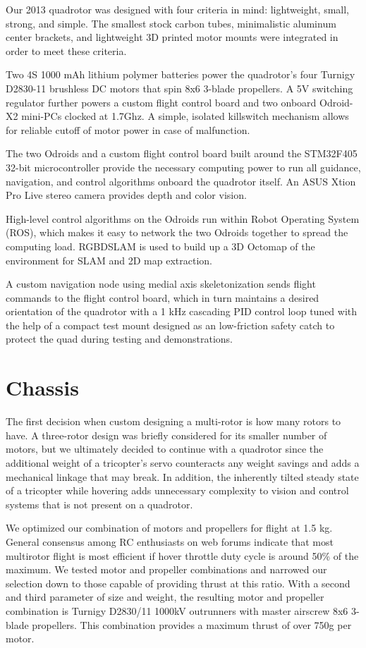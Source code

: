 \documentclass[12pt,letterpaper]{article} \usepackage[margin=1in]{geometry}
\begin{document}
Our 2013 quadrotor was designed with four criteria in mind: lightweight, small,
strong, and simple. The smallest stock carbon tubes, minimalistic aluminum
center brackets, and lightweight 3D printed motor mounts were integrated in
order to meet these criteria.

Two 4S 1000 mAh lithium polymer batteries power the quadrotor's four Turnigy
D2830-11 brushless DC motors that spin 8x6 3-blade propellers. A 5V switching
regulator further powers a custom flight control board and two onboard
Odroid-X2 mini-PCs clocked at 1.7Ghz. A simple, isolated killswitch mechanism
allows for reliable cutoff of motor power in case of malfunction.

The two Odroids and a custom flight control board built around the STM32F405
32-bit microcontroller provide the necessary computing power to run all
guidance, navigation, and control algorithms onboard the quadrotor itself. An
ASUS Xtion Pro Live stereo camera provides depth and color vision. 

High-level control algorithms on the Odroids run within Robot Operating System
(ROS), which makes it easy to network the two Odroids together to spread the
computing load. RGBDSLAM is used to build up a 3D Octomap of the environment
for SLAM and 2D map extraction.

A custom navigation node using medial axis skeletonization sends flight
commands to the flight control board, which in turn maintains a desired
orientation of the quadrotor with a 1 kHz cascading PID control loop tuned with
the help of a compact test mount designed as an low-friction safety catch to
protect the quad during testing and demonstrations.



\section*{Chassis}

The first decision when custom designing a multi-rotor is how many rotors to
have. A three-rotor design was briefly considered for its smaller number of
motors, but we ultimately decided to continue with a quadrotor since the
additional weight of a tricopter's servo counteracts any weight savings and
adds a mechanical linkage that may break. In addition, the inherently tilted
steady state of a tricopter while hovering adds unnecessary complexity to
vision and control systems that is not present on a quadrotor.

We optimized our combination of motors and propellers for flight at 1.5 kg.
General consensus among RC enthusiasts on web forums indicate that most
multirotor flight is most efficient if hover throttle duty cycle is around 50\%
of the maximum. We tested motor and propeller combinations and narrowed our
selection down to those capable of providing thrust at this ratio. With
a second and third parameter of size and weight, the resulting motor and
propeller combination is Turnigy D2830/11 1000kV outrunners with master
airscrew 8x6 3-blade propellers. This combination provides a maximum thrust of
over 750g per motor.
\end{document}
